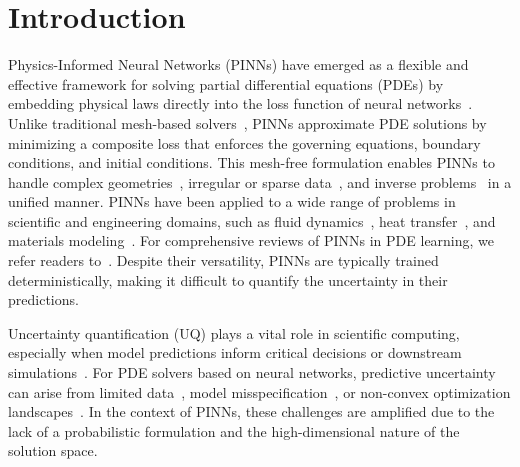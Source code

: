 \documentclass[preprint,12pt]{elsarticle}
\begin{document}
\begin{frontmatter}


\end{frontmatter}

\section{Introduction}
\label{sec:intro}

Physics-Informed Neural Networks (PINNs) have emerged as a flexible and effective framework for solving partial differential equations (PDEs) by embedding physical laws directly into the loss function of neural networks~\cite{raissi_physics-informed_2019, karniadakis2021physics, mcclenny2023self}. Unlike traditional mesh-based solvers~\cite{reddy1993introduction, patera1984spectral}, PINNs approximate PDE solutions by minimizing a composite loss that enforces the governing equations, boundary conditions, and initial conditions. This mesh-free formulation enables PINNs to handle complex geometries~\cite{xiang2022hybrid}, irregular or sparse data~\cite{oldenburg2022geometry}, and inverse problems~\cite{lu2021physics} in a unified manner. PINNs have been applied to a wide range of problems in scientific and engineering domains, such as fluid dynamics~\cite{cai_physics-informed_fluid_2021}, heat transfer~\cite{cai_physics-informed_heat_2021-1}, and materials modeling~\cite{misyris_physics-informed_2020}. For comprehensive reviews of PINNs in PDE learning, we refer readers to~\cite{cuomo2022scientific,  de2024numerical}. Despite their versatility, PINNs are typically trained deterministically, making it difficult to quantify the uncertainty in their predictions.

Uncertainty quantification (UQ) plays a vital role in scientific computing, especially when model predictions inform critical decisions or downstream simulations~\cite{zou2024neuraluq, roy2011comprehensive}. For PDE solvers based on neural networks, predictive uncertainty can arise from limited data~\cite{chatfield1995model}, model misspecification~\cite{uppal2003model}, or non-convex optimization landscapes~\cite{gadat2022asymptotic}. In the context of PINNs, these challenges are amplified due to the lack of a probabilistic formulation and the high-dimensional nature of the solution space.
\end{document}
